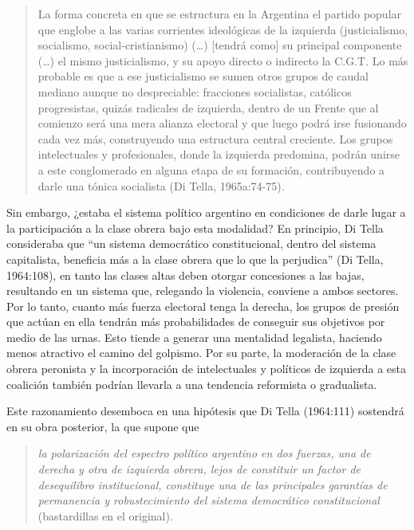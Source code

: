 \begin{quote}
La forma concreta en que se estructura en la Argentina el partido popular que englobe a las varias corrientes ideológicas de la izquierda (justicialismo, socialismo, social-cristianismo) (\dots) [tendrá como] su principal componente (\dots) el mismo justicialismo, y su apoyo directo o indirecto la C.G.T. Lo más probable es que a ese justicialismo se sumen otros grupos de caudal mediano aunque no despreciable: fracciones socialistas, católicos progresistas, quizás radicales de izquierda, dentro de un Frente que al comienzo será una mera alianza electoral y que luego podrá irse fusionando cada vez más, construyendo una estructura central creciente. Los grupos intelectuales y profesionales, donde la izquierda predomina, podrán unirse a este conglomerado en alguna etapa de su formación, contribuyendo a darle una tónica socialista (Di Tella, 1965a:74-75).
\end{quote}

Sin embargo, ¿estaba el sistema político argentino en condiciones de darle lugar a la participación a la clase obrera bajo esta modalidad? En principio, Di Tella consideraba que \enquote{un sistema democrático constitucional, dentro del sistema capitalista, beneficia más a la clase obrera que lo que la perjudica} (Di Tella, 1964:108), en tanto las clases altas deben otorgar concesiones a las bajas, resultando en un sistema que, relegando la violencia, conviene a ambos sectores. Por lo tanto, cuanto más fuerza electoral tenga la derecha, los grupos de presión que actúan en ella tendrán más probabilidades de conseguir sus objetivos por medio de las urnas. Esto tiende a generar una mentalidad legalista, haciendo menos atractivo el camino del golpismo. Por su parte, la moderación de la clase obrera peronista y la incorporación de intelectuales y políticos de izquierda a esta coalición también podrían llevarla a una tendencia reformista o gradualista.

Este razonamiento desemboca en una hipótesis que Di Tella (1964:111) sostendrá en su obra posterior, la que supone que

\begin{quote}
\emph{la polarización del espectro político argentino en dos fuerzas, una de derecha y otra de izquierda obrera, lejos de constituir un factor de desequilibro institucional, constituye una de las principales garantías de permanencia y robustecimiento del sistema democrático constitucional} (bastardillas en el original).
\end{quote}

